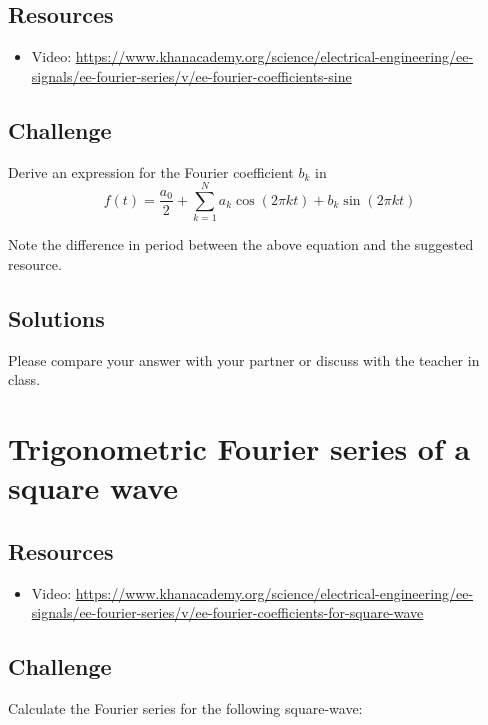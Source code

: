 \subsection*{Resources}
\begin{itemize}
    \item Video: \url{https://www.khanacademy.org/science/electrical-engineering/ee-signals/ee-fourier-series/v/ee-fourier-coefficients-sine}
\end{itemize}

\subsection*{Challenge}
Derive an expression for the Fourier coefficient $b_k$ in
\begin{equation}
    f(t) = \frac{a_0}{2} + \sum_{k=1}^{N} a_k \cos(2 \pi k t) + b_k \sin(2 \pi k t)
\end{equation}

Note the difference in period between the above equation and the suggested resource.

\subsection*{Solutions}
Please compare your answer with your partner or discuss with the teacher in class.




\newpage
\section{Trigonometric Fourier series of a square wave}
\label{sec:1stsqwch}

\subsection*{Resources}
\begin{itemize}
    \item Video: \url{https://www.khanacademy.org/science/electrical-engineering/ee-signals/ee-fourier-series/v/ee-fourier-coefficients-for-square-wave}
\end{itemize}

\subsection*{Challenge}
Calculate the Fourier series for the following square-wave:


